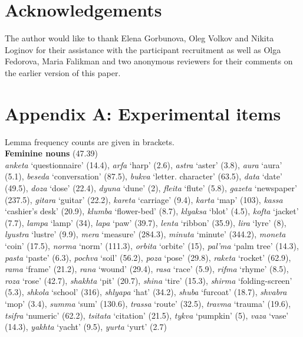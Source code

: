 \documentclass[output=paper, modfonts,newtxmath,hidelinks]{langscibook}
\begin{document}
\section*{Acknowledgements}

The author would like to thank Elena Gorbunova, Oleg Volkov and Nikita Loginov for their assistance with the participant recruitment as well as Olga Fedorova,  Maria Falikman and two anonymous reviewers for their comments on the earlier version of this paper.


\section*{Appendix A: Experimental items}

Lemma frequency counts are given in brackets.\\

\noindent \textbf{Feminine nouns} (47.39)\\

\noindent \textit{anketa} `questionnaire' (14.4),
\textit{arfa} `harp' (2.6),
\textit{astra} `aster' (3.8),
\textit{aura} `aura' (5.1),
\textit{beseda} `conversation' (87.5),
\textit{bukva} `letter. character' (63.5),
\textit{data} `date' (49.5),
\textit{doza} `dose' (22.4),
\textit{dyuna} `dune' (2),
\textit{fleita} `flute' (5.8),
\textit{gazeta} `newspaper' (237.5),
\textit{gitara} `guitar' (22.2),
\textit{kareta} `carriage' (9.4),
\textit{karta} `map' (103),
\textit{kassa} `cashier's desk' (20.9),
\textit{klumba} `flower-bed' (8.7),
\textit{klyaksa} `blot' (4.5),
\textit{kofta} `jacket' (7.7),
\textit{lampa} `lamp' (34),
\textit{lapa} `paw' (39.7),
\textit{lenta} `ribbon' (35.9),
\textit{lira} `lyre' (8),
\textit{lyustra} `lustre' (9.9),
\textit{mera} `measure' (284.3),
\textit{minuta} `minute' (344.2),
\textit{moneta} `coin' (17.5),
\textit{norma} `norm' (111.3),
\textit{orbita} `orbite' (15),
\textit{pal'ma} `palm tree' (14.3),
\textit{pasta} `paste' (6.3),
\textit{pochva} `soil' (56.2),
\textit{poza} `pose' (29.8),
\textit{raketa} `rocket' (62.9),
\textit{rama} `frame' (21.2),
\textit{rana} `wound' (29.4),
\textit{rasa} `race' (5.9),
\textit{rifma} `rhyme' (8.5),
\textit{roza} `rose' (42.7),
\textit{shakhta} `pit' (20.7),
\textit{shina} `tire' (15.3),
\textit{shirma} `folding-screen' (5.3),
\textit{shkola} `school' (316),
\textit{shlyapa} `hat' (34.2),
\textit{shuba} `furcoat' (18.7),
\textit{shvabra} `mop' (3.4),
\textit{summa} `sum' (130.6),
\textit{trassa} `route' (32.5),
\textit{travma} `trauma' (19.6),
\textit{tsifra} `numeric' (62.2),
\textit{tsitata} `citation' (21.5),
\textit{tykva} `pumpkin' (5),
\textit{vaza} `vase' (14.3),
\textit{yakhta} `yacht' (9.5),
\textit{yurta} `yurt' (2.7)\\
\end{document}
